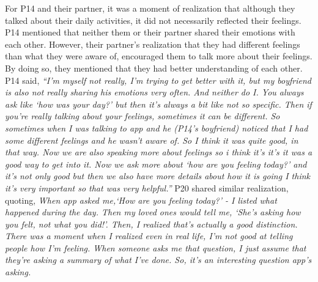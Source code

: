     
   			
            
        For P14 and their partner, it was a moment of realization that although they talked about their daily activities, it did not necessarily reflected their feelings. 
        P14 mentioned that neither them or their partner shared their emotions with each other. However, their partner's realization that they had different feelings than what they were aware of, encouraged them to talk more about their feelings. By doing so, they mentioned that they had better understanding of each other. P14 said,
            \textit{
            ``I'm myself not really, I'm trying to get better with it, but my boyfriend is also not really sharing his emotions very often. And neither do I. 
            You always ask like `how was your day?' but then it's always a bit like not so specific. Then if you're really talking about your feelings, sometimes it can be different. So sometimes when I was talking to \acl{app} and he (P14's boyfriend) noticed that I had some different feelings and he wasn't aware of. So I think it was quite good, in that way.
            Now we are also speaking more about feelings so i think it's it's it was a good way to get into it. Now we ask more about `how are you feeling today?' and it's not only good but then we also have more details about how it is going I think it's very important so that was very helpful.''
            }
        P20 shared similar realization, quoting,
            \textit{When \acl{app} asked me,`How are you feeling today?' - I listed what happened during the day. Then my loved ones would tell me, `She’s asking how you felt, not what you did!'. Then, I realized that’s actually a good distinction. There was a moment when I realized even in real life, I’m not good at telling people how I’m feeling. When someone asks me that question, I just assume that they’re asking a summary of what I’ve done. So, it’s an interesting question \acl{app}’s asking.}
            

